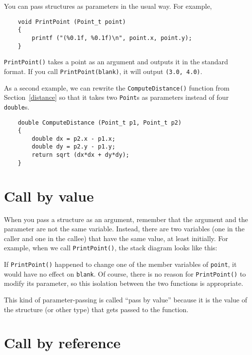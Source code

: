 You can pass structures as parameters in the usual way.  For
example,

\begin{verbatim}
	void PrintPoint (Point_t point) 
	{
		printf ("(%0.1f, %0.1f)\n", point.x, point.y);
	}
\end{verbatim}
%
{\tt PrintPoint()} takes a point as an argument and outputs it in
the standard format.  If you call {\tt PrintPoint(blank)},
it will output {\tt (3.0, 4.0)}.

As a second example, we can rewrite the {\tt ComputeDistance()} function from
Section~\ref{distance} so that it takes two {\tt Point}s as parameters
instead of four {\tt double}s.

\begin{verbatim}
	double ComputeDistance (Point_t p1, Point_t p2) 
	{
		double dx = p2.x - p1.x;
		double dy = p2.y - p1.y;
		return sqrt (dx*dx + dy*dy);
	}
\end{verbatim}

\section{Call by value}
\label{Call by value}

When you pass a structure as an argument, remember that the
argument and the parameter are not the same variable.  Instead,
there are two variables (one in the caller and one in the
callee) that have the same value, at least initially.  For
example, when we call {\tt PrintPoint()}, the stack diagram
looks like this:

\vspace{0.1in}
\centerline{}
\vspace{0.1in}
%
If {\tt PrintPoint()} happened to change one of the member variables
of {\tt point}, it would have no effect on {\tt blank}.  Of course, there
is no reason for {\tt PrintPoint()} to modify its parameter, so this
isolation between the two functions is appropriate.

This kind of parameter-passing is called ``pass by value''
because it is the value of the structure (or other type) that
gets passed to the function.

\section{Call by reference}
\label{Call by reference}

